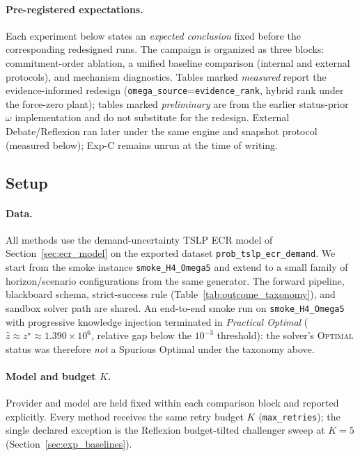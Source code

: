 \documentclass[a4paper,fleqn]{cas-sc}
\begin{document}
\paragraph{Pre-registered expectations.}
Each experiment below states an \emph{expected conclusion} fixed before the
corresponding redesigned runs. The campaign is organized as three blocks:
commitment-order ablation, a unified baseline comparison (internal and
external protocols), and mechanism diagnostics. Tables marked
\emph{measured} report the evidence-informed redesign
(\texttt{omega\_source}=\texttt{evidence\_rank}, hybrid rank under the
force-zero plant); tables marked \emph{preliminary} are from the earlier
status-prior $\omega$ implementation and do not substitute for the redesign.
External Debate/Reflexion ran later under the same engine and snapshot
protocol (measured below); Exp-C remains unrun at the time of writing.

\subsection{Setup}
\label{sec:exp_setup}

\paragraph{Data.}
All methods use the demand-uncertainty TSLP ECR model of
Section~\ref{sec:ecr_model} on the exported dataset
\texttt{prob\_\allowbreak tslp\_\allowbreak ecr\_\allowbreak demand}. We start from the smoke instance
\texttt{smoke\_H4\_Omega5} and extend to a small family of
horizon/scenario configurations from the same generator. The forward
pipeline, blackboard schema, strict-success rule
(Table~\ref{tab:outcome_taxonomy}), and sandbox solver path are shared. An
end-to-end smoke run on \texttt{smoke\_H4\_Omega5} with progressive knowledge
injection terminated in \emph{Practical Optimal}
($\hat{z}\approx z^{\star}\approx 1.390\times 10^{6}$, relative gap below the
$10^{-3}$ threshold): the solver's \textsc{Optimal} status was therefore
\emph{not} a Spurious Optimal under the taxonomy above.

\paragraph{Model and budget $K$.}
Provider and model are held fixed within each comparison block and reported
explicitly. Every method receives the same retry budget $K$
(\texttt{max\_retries}); the single declared exception is the Reflexion
budget-tilted challenger sweep at $K{=}5$
(Section~\ref{sec:exp_baselines}).
\end{document}
